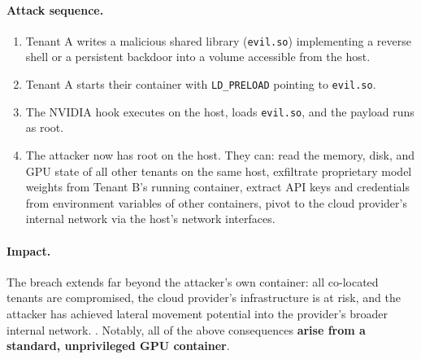 \paragraph{Attack sequence.}
\begin{enumerate}
  \item Tenant A writes a malicious shared library (\texttt{evil.so}) implementing a reverse shell or a persistent backdoor into a volume accessible from the host.
  \item Tenant A starts their container with \texttt{LD\_PRELOAD} pointing to \texttt{evil.so}.
  \item The NVIDIA hook executes on the host, loads \texttt{evil.so}, and the payload runs as root.
  \item The attacker now has root on the host. They can: read the memory, disk, and GPU state of all other tenants on the same host, exfiltrate proprietary model weights from Tenant B's running container, extract API keys and credentials from environment variables of other containers, pivot to the cloud provider's internal network via the host's network interfaces.
\end{enumerate}
 
\paragraph{Impact.} The breach extends far beyond the attacker's own container: all co-located tenants are compromised, the cloud provider's infrastructure is at risk, and the attacker has achieved lateral movement potential into the provider's broader internal network. \cite{nvd_cve_2025_23266} \cite{wiz_nvidia_2024}.
 Notably, all of the above consequences \textbf{arise from a standard, unprivileged GPU container}.